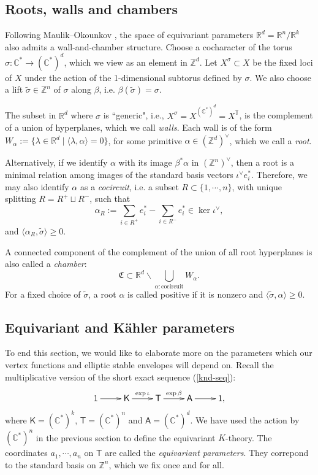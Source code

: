\documentclass[10pt]{amsart}
\theoremstyle{definition}
\def\ZZ{{\mathbb{Z}}}
\def\RR{{\mathbb{R}}}
\def\CC{{\mathbb{C}}}
\def\TT{\mathbb{T}}
\newcommand{\bA}{\mathsf{A}}
\newcommand{\bT}{\mathsf{T}}
\newcommand{\bK}{\mathsf{K}}
\theoremstyle{definition}
\numberwithin{equation}{section}
\theoremstyle{Theorem}
\newcommand{\fC}{\mathfrak{C}} %
\begin{document}
\subsection{Roots, walls and chambers} \label{section-root}

Following Maulik--Okounkov \cite{MO}, the space of equivariant parameters $\RR^d = \RR^n / \RR^k$ also admits a wall-and-chamber structure. Choose a cocharacter of the torus $\sigma : \CC^* \to (\CC^*)^d$, which we view as an element in $\ZZ^d$. Let $X^\sigma \subset X$ be the fixed loci of $X$ under the action of the 1-dimensional subtorus defined by $\sigma$. We also choose a lift $\widetilde \sigma \in \ZZ^n$ of $\sigma$ along $\beta$, i.e. $\beta (\widetilde\sigma) = \sigma$.

The subset in $\RR^d$ where $\sigma$ is ``generic", i.e., $X^\sigma = X^{(\CC^*)^d} = X^\TT$, is the complement of a union of hyperplanes, which we call \emph{walls}. Each wall is of the form $W_\alpha := \{ \lambda \in \RR^d \mid \langle \lambda, \alpha \rangle = 0 \}$, for some primitive $\alpha \in (\ZZ^d)^\vee$, which we call a \emph{root}.

Alternatively, if we identify $\alpha$ with its image $\beta^* \alpha$ in $(\ZZ^n)^\vee$, then a root is a minimal relation among images of the standard basis vectors $\iota^\vee e_i^*$. Therefore, we may also identify $\alpha$ as a \emph{cocircuit}, i.e. a subset $R \subset \{1, \cdots, n\}$, with unique splitting $R = R^+ \sqcup R^-$, such that
$$
\alpha_R := \sum_{i\in R^+} e_i^* - \sum_{i\in R^-} e_i^* \in \ker \iota^\vee,
$$
and $\langle \alpha_R, \widetilde\sigma \rangle \geq 0$.

A connected component of the complement of the union of all root hyperplanes is also called a \emph{chamber}:
$$
\fC \subset \RR^d \backslash \bigcup_{\alpha: \text{cocircuit}} W_\alpha.
$$
For a fixed choice of $\widetilde\sigma$, a root $\alpha$ is called positive if it is nonzero and $\langle \widetilde\sigma, \alpha \rangle \geq 0$.


\subsection{Equivariant and K\"ahler parameters} \label{sec-para}

To end this section, we would like to elaborate more on the parameters which our vertex functions and elliptic stable envelopes will depend on. Recall the multiplicative version of the short exact sequence (\ref{knd-seq}):
$$
\xymatrix{
	1 \ar[r] & \bK \ar[r]^-{\exp \iota} & \bT \ar[r]^-{\exp \beta} & \bA \ar[r] & 1,
}
$$
where $\bK = (\CC^*)^k$, $\bT = (\CC^*)^n$ and $\bA = (\CC^*)^d$. We have used the action by $(\CC^*)^n$ in the previous section to define the equivariant $K$-theory. The coordinates $a_1, \cdots, a_n$ on $\bT$ are called the \emph{equivariant parameters}. They correpond to the standard basis on $\ZZ^n$, which we fix once and for all.
\end{document}
